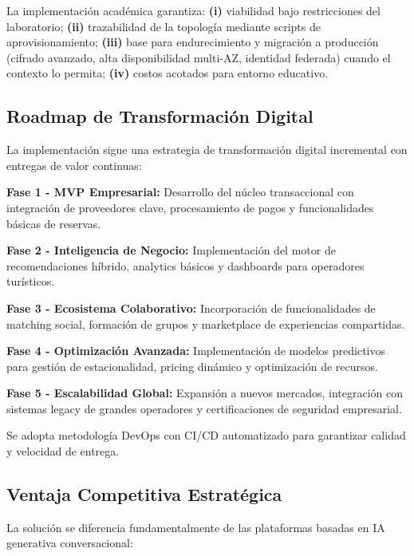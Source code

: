 \documentclass[12pt, letterpaper]{article}
\begin{document}
La implementación académica garantiza: \textbf{(i)} viabilidad bajo restricciones del laboratorio; \textbf{(ii)} trazabilidad de la topología mediante scripts de aprovisionamiento; \textbf{(iii)} base para endurecimiento y migración a producción (cifrado avanzado, alta disponibilidad multi-AZ, identidad federada) cuando el contexto lo permita; \textbf{(iv)} costos acotados para entorno educativo.

\subsection*{Roadmap de Transformación Digital}

La implementación sigue una estrategia de transformación digital incremental con entregas de valor continuas:

\textbf{Fase 1 - MVP Empresarial:} Desarrollo del núcleo transaccional con integración de proveedores clave, procesamiento de pagos y funcionalidades básicas de reservas.

\textbf{Fase 2 - Inteligencia de Negocio:} Implementación del motor de recomendaciones híbrido, analytics básicos y dashboards para operadores turísticos.

\textbf{Fase 3 - Ecosistema Colaborativo:} Incorporación de funcionalidades de matching social, formación de grupos y marketplace de experiencias compartidas.

\textbf{Fase 4 - Optimización Avanzada:} Implementación de modelos predictivos para gestión de estacionalidad, pricing dinámico y optimización de recursos.

\textbf{Fase 5 - Escalabilidad Global:} Expansión a nuevos mercados, integración con sistemas legacy de grandes operadores y certificaciones de seguridad empresarial.

Se adopta metodología DevOps con CI/CD automatizado para garantizar calidad y velocidad de entrega.

\subsection*{Ventaja Competitiva Estratégica}

La solución se diferencia fundamentalmente de las plataformas basadas en IA generativa conversacional:
\end{document}
